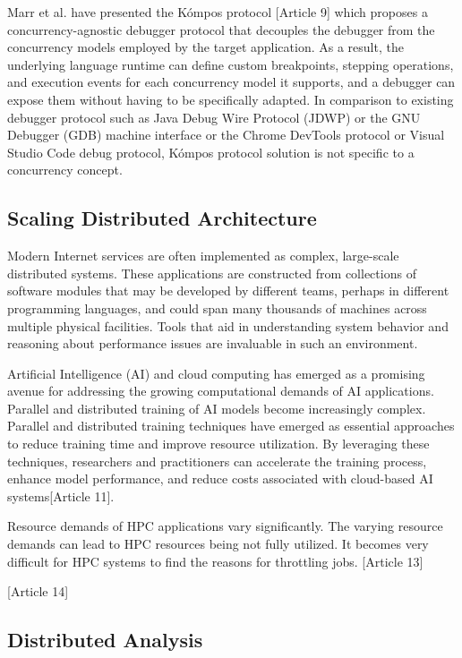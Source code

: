 Marr et al. have presented the Kómpos protocol [Article 9] which proposes a concurrency-agnostic debugger protocol that decouples the debugger from the concurrency models employed by the target application. As a result, the underlying language runtime can define custom breakpoints, stepping operations, and execution events for each concurrency model it supports, and a debugger can expose them without having to be specifically adapted. In comparison to existing debugger protocol such as Java Debug Wire Protocol (JDWP) or the GNU Debugger (GDB) machine interface or the Chrome DevTools protocol or Visual Studio Code debug protocol, Kómpos protocol solution is not specific to a concurrency concept.

\subsection{Scaling Distributed Architecture}

Modern Internet services are often implemented as complex, large-scale distributed systems. These applications are constructed from collections of software modules that may be developed by different teams, perhaps in different programming languages, and could span many thousands of machines across multiple physical facilities. Tools that aid in understanding system behavior and reasoning about performance issues are invaluable in such an environment.

Artificial Intelligence (AI) and cloud computing has emerged as a promising avenue for addressing the growing computational demands of AI applications. Parallel and distributed training of AI models become increasingly complex. Parallel and distributed training techniques have emerged as essential approaches to reduce training time and improve resource utilization. By leveraging these techniques, researchers and practitioners can accelerate the training process, enhance model performance, and reduce costs associated with cloud-based AI systems[Article 11].

Resource demands of HPC applications vary significantly. The varying resource demands can lead to HPC resources being not fully utilized. It becomes very difficult for HPC systems to find the reasons for throttling jobs. [Article 13]

[Article 14]



\subsection{Distributed Analysis}

